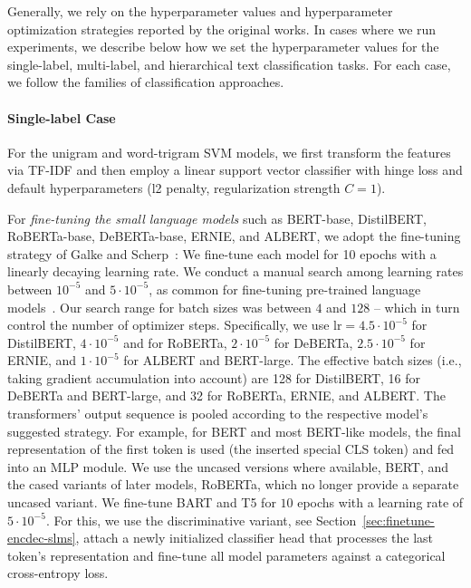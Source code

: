 \documentclass[lettersize,journal]{IEEEtran}
\begin{document}
Generally, we rely on the hyperparameter values and hyperparameter optimization strategies reported by the original works.
In cases where we run experiments, we describe below how we set the hyperparameter values for the single-label, multi-label, and hierarchical text classification tasks.
For each case, we follow the families of classification approaches.

\paragraph{Single-label Case}
For the unigram and word-trigram SVM models, we first transform the features via TF-IDF and then employ a linear support vector classifier with hinge loss and default hyperparameters (l2 penalty, regularization strength $C=1$).

For \textit{fine-tuning the small language models} such as 
BERT-base, DistilBERT, 
RoBERTa-base, 
DeBERTa-base, ERNIE, and ALBERT, we adopt the fine-tuning strategy of Galke and Scherp~\cite{galkescherp-acl2022}:
We fine-tune each model for 10 epochs with a linearly decaying learning rate. We conduct a manual search among learning rates between $10^{-5}$ and $5 \cdot 10^{-5}$, as common for fine-tuning pre-trained language models~\cite{DBLP:conf/naacl/DevlinCLT19,T5}. Our search range for batch sizes was between $4$ and $128$ -- which in turn control the number of optimizer steps. 
Specifically, we use $\mathrm{lr}=4.5\cdot 10^{-5}$ for DistilBERT, $4 \cdot 10^{-5}$ and for RoBERTa, $2 \cdot 10^{-5}$ for DeBERTa, $2.5 \cdot 10^{-5}$ for ERNIE, and $1 \cdot 10^{-5}$ for ALBERT and BERT-large. 
The effective batch sizes (i.e., taking gradient accumulation into account) are 128 for DistilBERT, 16 for DeBERTa and BERT-large, and 32 for RoBERTa, ERNIE, and ALBERT.
The transformers' output sequence is pooled according to the respective model's suggested strategy.
For example, for BERT and most BERT-like models, the final representation of the first token is used (the inserted special CLS token) and fed into an MLP module. 
We use the uncased versions where available, \eg BERT, and the cased variants of later models, \eg RoBERTa, which no longer provide a separate uncased variant.
We fine-tune BART and T5 for $10$ epochs with a learning rate of $5\cdot
10^{-5}$. 
For this, we use the discriminative variant, see Section~\ref{sec:finetune-encdec-slms}, \ie attach a newly initialized classifier head that processes the last token's representation and fine-tune all model parameters against a categorical cross-entropy loss.
\end{document}
